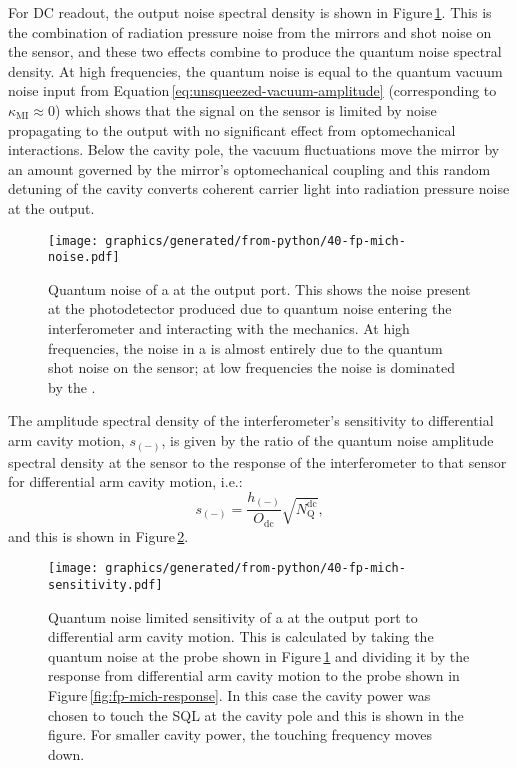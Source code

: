 For \gls{DC} readout, the output noise spectral density is shown in Figure\,\ref{fig:fp-mich-noise}. This is the combination of radiation pressure noise from the mirrors and shot noise on the sensor, and these two effects combine to produce the quantum noise spectral density. At high frequencies, the quantum noise is equal to the quantum vacuum noise input from Equation\,\ref{eq:unsqueezed-vacuum-amplitude} (corresponding to $\kappa_{\text{MI}} \approx 0$) which shows that the signal on the sensor is limited by noise propagating to the output with no significant effect from optomechanical interactions. Below the cavity pole, the vacuum fluctuations move the mirror by an amount governed by the mirror's optomechanical coupling and this random detuning of the cavity converts coherent carrier light into radiation pressure noise at the output.

\begin{figure}
  \centering
  \texttt{[image: graphics/generated/from-python/40-fp-mich-noise.pdf]}
  \caption[Quantum noise of a \FPMI{} at the output port]{\label{fig:fp-mich-noise}Quantum noise of a \FPMI{} at the output port. This shows the noise present at the photodetector produced due to quantum noise entering the interferometer and interacting with the mechanics. At high frequencies, the noise in a \MI{} is almost entirely due to the quantum shot noise on the sensor; at low frequencies the noise is dominated by the .}
\end{figure}

The amplitude spectral density of the interferometer's sensitivity to differential arm cavity motion, $s_{\left( - \right)}$, is given by the ratio of the quantum noise amplitude spectral density at the sensor to the response of the interferometer to that sensor for differential arm cavity motion, i.e.:
\begin{equation}
  s_{\left( - \right)} = \frac{h_{\left( - \right)}}{O_{\text{dc}}} \sqrt{N_{\text{Q}}^{\text{dc}}},
\end{equation}
and this is shown in Figure\,\ref{fig:fp-mich-sensitivity}.

\begin{figure}
  \centering
  \texttt{[image: graphics/generated/from-python/40-fp-mich-sensitivity.pdf]}
  \caption[Sensitivity of a \FPMI{} at the output port to differential arm cavity motion]{\label{fig:fp-mich-sensitivity}Quantum noise limited sensitivity of a \FPMI{} at the output port to differential arm cavity motion. This is calculated by taking the quantum noise at the probe shown in Figure\,\ref{fig:fp-mich-noise} and dividing it by the response from differential arm cavity motion to the probe shown in Figure\,\ref{fig:fp-mich-response}. In this case the cavity power was chosen to touch the \gls{SQL} at the cavity pole and this is shown in the figure. For smaller cavity power, the touching frequency moves down.}
\end{figure}

